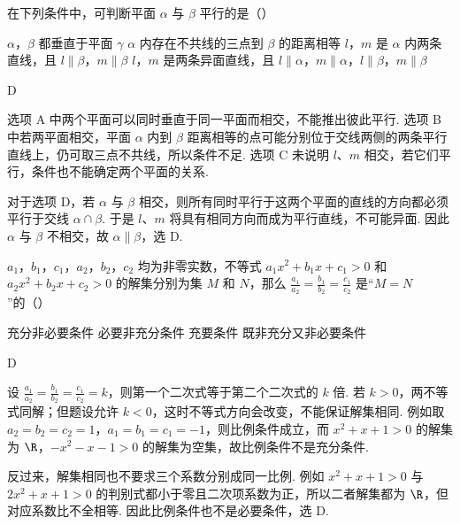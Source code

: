 \begin{problem}
在下列条件中，可判断平面 \(\alpha\) 与 \(\beta\) 平行的是（\quad）

\choices
    {\(\alpha\)，\(\beta\) 都垂直于平面 \(\gamma\)}
    {\(\alpha\) 内存在不共线的三点到 \(\beta\) 的距离相等}
    {\(l\)，\(m\) 是 \(\alpha\) 内两条直线，且 \(l \parallel \beta\)，\(m \parallel \beta\)}
    {\(l\)，\(m\) 是两条异面直线，且 \(l \parallel \alpha\)，\(m \parallel \alpha\)，\(l \parallel \beta\)，\(m \parallel \beta\)}
\end{problem}

\begin{answer}
D
\end{answer}

\begin{solution}
选项 A 中两个平面可以同时垂直于同一平面而相交，不能推出彼此平行. 选项 B 中若两平面相交，平面 \(\alpha\) 内到 \(\beta\) 距离相等的点可能分别位于交线两侧的两条平行直线上，仍可取三点不共线，所以条件不足. 选项 C 未说明 \(l\)、\(m\) 相交，若它们平行，条件也不能确定两个平面的关系.

对于选项 D，若 \(\alpha\) 与 \(\beta\) 相交，则所有同时平行于这两个平面的直线的方向都必须平行于交线 \(\alpha\cap\beta\). 于是 \(l\)、\(m\) 将具有相同方向而成为平行直线，不可能异面. 因此 \(\alpha\) 与 \(\beta\) 不相交，故 \(\alpha\parallel\beta\)，选 D.
\end{solution}

\begin{problem}
\(a_{1}\)，\(b_{1}\)，\(c_{1}\)，\(a_{2}\)，\(b_{2}\)，\(c_{2}\) 均为非零实数，不等式 \(a_{1}x^{2} + b_{1}x + c_{1} > 0\) 和 \(a_{2}x^{2} + b_{2}x + c_{2} > 0\) 的解集分别为集 \(M\) 和 \(N\)，那么 \(\frac{a_1}{a_2} = \frac{b_1}{b_2} = \frac{c_1}{c_2}\) 是“\(M = N\)”的（\quad）

\choices
    {充分非必要条件}
    {必要非充分条件}
    {充要条件}
    {既非充分又非必要条件}
\end{problem}

\begin{answer}
D
\end{answer}

\begin{solution}
设 \(\frac{a_1}{a_2}=\frac{b_1}{b_2}=\frac{c_1}{c_2}=k\)，则第一个二次式等于第二个二次式的 \(k\) 倍. 若 \(k>0\)，两不等式同解；但题设允许 \(k<0\)，这时不等式方向会改变，不能保证解集相同. 例如取 \(a_2=b_2=c_2=1\)，\(a_1=b_1=c_1=-1\)，则比例条件成立，而 \(x^2+x+1>0\) 的解集为 \(\R\)，\(-x^2-x-1>0\) 的解集为空集，故比例条件不是充分条件.

反过来，解集相同也不要求三个系数分别成同一比例. 例如 \(x^2+x+1>0\) 与 \(2x^2+x+1>0\) 的判别式都小于零且二次项系数为正，所以二者解集都为 \(\R\)，但对应系数比不全相等. 因此比例条件也不是必要条件，选 D.
\end{solution}

